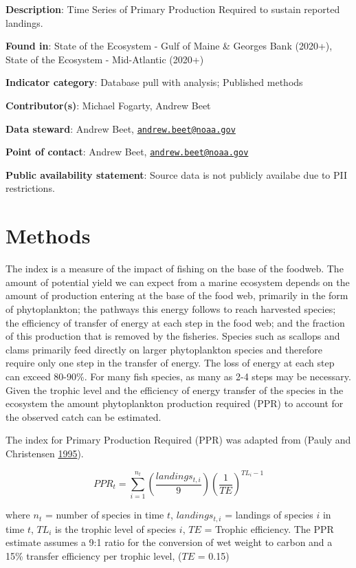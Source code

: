 \documentclass[
]{book}
\begin{document}
\textbf{Description}: Time Series of Primary Production Required to sustain reported landings.

\textbf{Found in}: State of the Ecosystem - Gulf of Maine \& Georges Bank (2020+), State of the Ecosystem - Mid-Atlantic (2020+)

\textbf{Indicator category}: Database pull with analysis; Published methods

\textbf{Contributor(s)}: Michael Fogarty, Andrew Beet

\textbf{Data steward}: Andrew Beet, \href{mailto:andrew.beet@noaa.gov}{\nolinkurl{andrew.beet@noaa.gov}}

\textbf{Point of contact}: Andrew Beet, \href{mailto:andrew.beet@noaa.gov}{\nolinkurl{andrew.beet@noaa.gov}}

\textbf{Public availability statement}: Source data is not publicly availabe due to PII restrictions.

\hypertarget{methods-27}{%
\section{Methods}\label{methods-27}}

The index is a measure of the impact of fishing on the base of the foodweb. The amount of potential yield we can expect from a marine ecosystem depends on the amount of production entering at the base of the food web, primarily in the form of phytoplankton; the pathways this energy follows to reach harvested species; the efficiency of transfer of energy at each step in the food web; and the fraction of this production that is removed by the fisheries. Species such as scallops and clams primarily feed directly on larger phytoplankton species and therefore require only one step in the transfer of energy. The loss of energy at each step can exceed 80-90\%. For many fish species, as many as 2-4 steps may be necessary. Given the trophic level and the efficiency of energy transfer of the species in the ecosystem the amount phytoplankton production required (PPR) to account for the observed catch can be estimated.

The index for Primary Production Required (PPR) was adapted from (Pauly and Christensen \protect\hyperlink{ref-pauly1995ppr}{1995}).

\[PPR_t = \sum_{i=1}^{n_t}  \left(\frac{landings_{t,i}}{9}\right) \left(\frac{1}{TE}\right)^{TL_i-1}\]

where \(n_t\) = number of species in time \(t\), \(landings_{t,i}\) = landings of species \(i\) in time \(t\), \(TL_i\) is the trophic level of species \(i\), \(TE\) = Trophic efficiency. The PPR estimate assumes a 9:1 ratio for the conversion of wet weight to carbon and a 15\% transfer efficiency per trophic level, (\(TE\) = 0.15)
\end{document}
